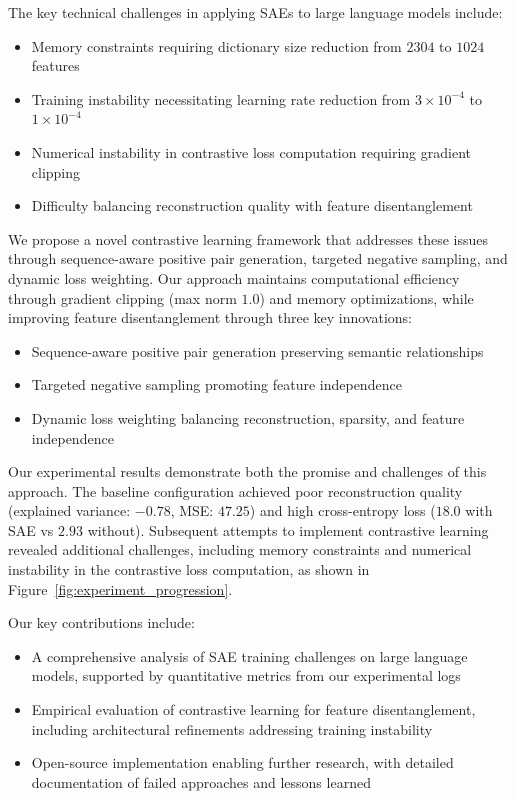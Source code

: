 \documentclass{article} %
\begin{document}
The key technical challenges in applying SAEs to large language models include:
\begin{itemize}
    \item Memory constraints requiring dictionary size reduction from $2304$ to $1024$ features
    \item Training instability necessitating learning rate reduction from $3\times10^{-4}$ to $1\times10^{-4}$
    \item Numerical instability in contrastive loss computation requiring gradient clipping
    \item Difficulty balancing reconstruction quality with feature disentanglement
\end{itemize}

We propose a novel contrastive learning framework that addresses these issues through sequence-aware positive pair generation, targeted negative sampling, and dynamic loss weighting. Our approach maintains computational efficiency through gradient clipping (max norm $1.0$) and memory optimizations, while improving feature disentanglement through three key innovations:
\begin{itemize}
    \item Sequence-aware positive pair generation preserving semantic relationships
    \item Targeted negative sampling promoting feature independence
    \item Dynamic loss weighting balancing reconstruction, sparsity, and feature independence
\end{itemize}

Our experimental results demonstrate both the promise and challenges of this approach. The baseline configuration achieved poor reconstruction quality (explained variance: $-0.78$, MSE: $47.25$) and high cross-entropy loss ($18.0$ with SAE vs $2.93$ without). Subsequent attempts to implement contrastive learning revealed additional challenges, including memory constraints and numerical instability in the contrastive loss computation, as shown in Figure~\ref{fig:experiment_progression}.

Our key contributions include:
\begin{itemize}
    \item A comprehensive analysis of SAE training challenges on large language models, supported by quantitative metrics from our experimental logs
    \item Empirical evaluation of contrastive learning for feature disentanglement, including architectural refinements addressing training instability
    \item Open-source implementation enabling further research, with detailed documentation of failed approaches and lessons learned
\end{itemize}
\end{document}
